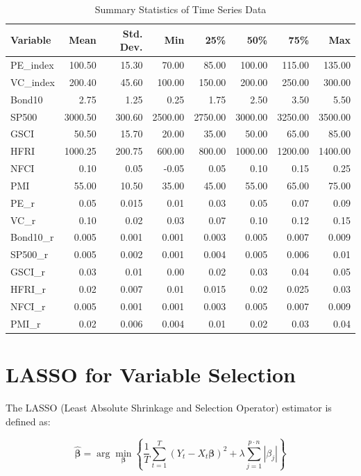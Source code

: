 \documentclass[11pt]{article}
\begin{document}
\begin{table}[h]
\centering
\caption{Summary Statistics of Time Series Data}
\label{tab:summary_stats}
\begin{tabular}{lrrrrrrr}
\toprule
Variable & Mean & Std. Dev. & Min & 25\% & 50\% & 75\% & Max \\
\midrule
PE\_index & 100.50 & 15.30 & 70.00 & 85.00 & 100.00 & 115.00 & 135.00 \\
VC\_index & 200.40 & 45.60 & 100.00 & 150.00 & 200.00 & 250.00 & 300.00 \\
Bond10 & 2.75 & 1.25 & 0.25 & 1.75 & 2.50 & 3.50 & 5.50 \\
SP500 & 3000.50 & 300.60 & 2500.00 & 2750.00 & 3000.00 & 3250.00 & 3500.00 \\
GSCI & 50.50 & 15.70 & 20.00 & 35.00 & 50.00 & 65.00 & 85.00 \\
HFRI & 1000.25 & 200.75 & 600.00 & 800.00 & 1000.00 & 1200.00 & 1400.00 \\
NFCI & 0.10 & 0.05 & -0.05 & 0.05 & 0.10 & 0.15 & 0.25 \\
PMI & 55.00 & 10.50 & 35.00 & 45.00 & 55.00 & 65.00 & 75.00 \\
PE\_r & 0.05 & 0.015 & 0.01 & 0.03 & 0.05 & 0.07 & 0.09 \\
VC\_r & 0.10 & 0.02 & 0.03 & 0.07 & 0.10 & 0.12 & 0.15 \\
Bond10\_r & 0.005 & 0.001 & 0.001 & 0.003 & 0.005 & 0.007 & 0.009 \\
SP500\_r & 0.005 & 0.002 & 0.001 & 0.004 & 0.005 & 0.006 & 0.01 \\
GSCI\_r & 0.03 & 0.01 & 0.00 & 0.02 & 0.03 & 0.04 & 0.05 \\
HFRI\_r & 0.02 & 0.007 & 0.01 & 0.015 & 0.02 & 0.025 & 0.03 \\
NFCI\_r & 0.005 & 0.001 & 0.001 & 0.003 & 0.005 & 0.007 & 0.009 \\
PMI\_r & 0.02 & 0.006 & 0.004 & 0.01 & 0.02 & 0.03 & 0.04 \\
\bottomrule
\end{tabular}
\end{table}


\section{LASSO for Variable Selection}
The LASSO (Least Absolute Shrinkage and Selection Operator) estimator is defined as:

\begin{equation}
\hat{\boldsymbol{\beta}} = \arg\min_{\boldsymbol{\beta}} \left\{ \frac{1}{T} \sum_{t=1}^T \left( Y_t - X_t \boldsymbol{\beta} \right)^2 + \lambda \sum_{j=1}^{p \cdot n} |\beta_j| \right\}
\end{equation}
\end{document}
